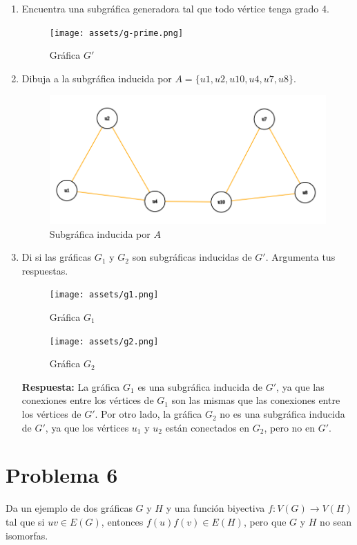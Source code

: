 \documentclass[12pt]{article}
\begin{document}
\begin{enumerate}
    \item Encuentra una subgráfica generadora tal que todo vértice tenga grado 4.
          \begin{figure}[h]
              \centering
              \texttt{[image: assets/g-prime.png]}
              \caption{Gráfica \( G' \)}
              \label{fig:g-prime}
          \end{figure}

    \item Dibuja a la subgráfica inducida por \( A = \{u1, u2, u10, u4, u7, u8\} \).
          \begin{figure}[H]
              \centering
              \includegraphics[width=1\textwidth]{assets/induced-subgraph.png}
              \caption{Subgráfica inducida por \( A \)}
              \label{fig:induced-subgraph}
          \end{figure}

    \item Di si las gráficas \( G_1 \) y \( G_2 \) son subgráficas inducidas de \( G' \). Argumenta tus respuestas.
          \begin{figure}[h]
              \centering
              \texttt{[image: assets/g1.png]}
              \caption{Gráfica \( G_1 \)}
              \label{fig:g1}
          \end{figure}
          \begin{figure}[h]
              \centering
              \texttt{[image: assets/g2.png]}
              \caption{Gráfica \( G_2 \)}
              \label{fig:g2}
          \end{figure}
          \textbf{Respuesta:} La gráfica \( G_1 \) es una subgráfica inducida de \( G' \), ya que las conexiones entre los vértices de \( G_1 \) son las mismas que las conexiones entre los vértices de \( G' \). Por otro lado, la gráfica \( G_2 \) no es una subgráfica inducida de \( G' \), ya que los vértices \( u_1 \) y \( u_2 \) están conectados en \( G_2 \), pero no en \( G' \).
\end{enumerate}


\section*{Problema 6}
Da un ejemplo de dos gráficas \( G \) y \( H \) y una función biyectiva \( f: V(G) \rightarrow V(H) \) tal que si \( uv \in E(G) \), entonces \( f(u)f(v) \in E(H) \), pero que \( G \) y \( H \) no sean isomorfas.
\end{document}

